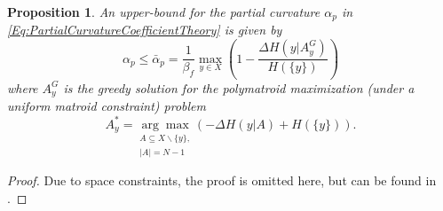 \documentclass[letterpaper, 10 pt, conference]{ieeeconf}
\newtheorem{proposition}{Proposition}
\begin{document}
\begin{proposition}\label{Pr:PartialCurvatureBound}
An upper-bound for the partial curvature $\alpha_p$ in \eqref{Eq:PartialCurvatureCoefficientTheory} is given by  
\begin{equation}\label{Eq:PartialCurvatureBound}
    \alpha_p \leq \bar{\alpha}_p = \frac{1}{\beta_f} \max_{y\in X} \left(1-\frac{\Delta H(y \vert A^G_y)}{H(\{y\})}\right)
\end{equation}
where $A^G_y$ is the greedy solution for the polymatroid maximization (under a uniform matroid constraint) problem
\begin{equation}\label{Eq:PartialCurvatureBound2}
    A_y^* = \underset{\substack{A\subseteq X\backslash \{y\}, \\ \vert A \vert = N-1}}{\arg\max} \left(-\Delta H(y \vert A)+H(\{y\})\right).
\end{equation}
\end{proposition}
\begin{proof}
Due to space constraints, the proof is omitted here, but can be found in \cite{Welikala2024Ax1}.    
\end{proof}
\end{document}
